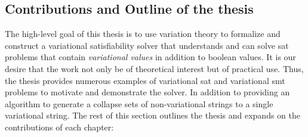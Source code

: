 \subsection{Contributions and Outline of the thesis}%
\label{sec:prop-contr}
The high-level goal of this thesis is to use variation theory to formalize and
construct a variational satisfiability solver that understands and can solve
\ac{sat} problems that contain \emph{variational values} in addition to boolean
values. It is our desire that the work not only be of theoretical interest but
of practical use. Thus, the thesis provides numerous examples of variational
\ac{sat} and variational \ac{smt} problems to motivate and demonstrate the
solver. In addition to providing an algorithm to generate a collapse sets of
non-variational strings to a single variational string. The rest of this section
outlines the thesis and expands on the contributions of each chapter:
